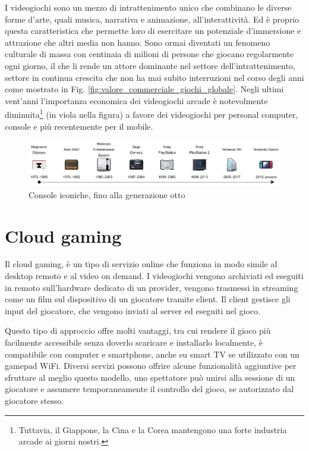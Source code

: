 I videogiochi sono un mezzo di intrattenimento unico che combinano le diverse forme d'arte, quali musica, narrativa e animazione, all'interattività. Ed è proprio questa caratteristica che permette loro di esercitare un potenziale d'immersione e attrazione che altri media non hanno. Sono ormai diventati un fenomeno culturale di massa con centinaia di milioni di persone che giocano regolarmente ogni giorno, il che li rende un attore dominante nel settore dell'intrattenimento, settore in continua crescita che non ha mai subito interruzioni nel corso degli anni come mostrato in Fig. \ref{fig:valore_commerciale_giochi_globale}. Negli ultimi vent'anni l'importanza economica dei videogiochi arcade è notevolmente diminuita\footnote{Tuttavia, il Giappone, la Cina e la Corea mantengono una forte industria arcade ai giorni nostri.} (in viola nella figura) a favore dei videogiochi per personal computer, console e più recentemente per il mobile.

\begin{figure}[H]
	\includegraphics[width=\linewidth]{immagini/consoles_history}
	\caption{Console iconiche, fino alla generazione otto}
	\label{fig:consoles_history}
\end{figure}

\section{Cloud gaming}
Il cloud gaming, è un tipo di servizio online che funziona in modo simile al desktop remoto e al video on demand. I videogiochi vengono archiviati ed eseguiti in remoto sull'hardware dedicato di un provider, vengono trasmessi in streaming come un film sul dispositivo di un giocatore tramite client. Il client gestisce gli input del giocatore, che vengono inviati al server ed eseguiti nel gioco.

Questo tipo di approccio offre molti vantaggi, tra cui rendere il gioco più facilmente accessibile senza doverlo scaricare e installarlo localmente, è compatibile con computer e smartphone, anche su smart TV se utilizzato con un gamepad WiFi. Diversi servizi possono offrire alcune funzionalità aggiuntive per sfruttare al meglio questo modello, uno spettatore può unirsi alla sessione di un giocatore e assumere temporaneamente il controllo del gioco, se autorizzato dal giocatore stesso.

